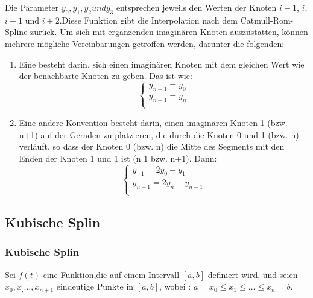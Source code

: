 {			
			
		
		Die Parameter \(y_0, y_1, y_2 und y_3\) entsprechen jeweils den Werten der Knoten \(i-1\), \(i\), \(i+1\) und \(i+2\).Diese Funktion gibt die Interpolation nach dem Catmull-Rom-Spline zurück.
		Um sich mit ergänzenden imaginären Knoten auszustatten, können mehrere mögliche Vereinbarungen getroffen werden, darunter die folgenden:
		\begin{enumerate}
			\item Eine besteht darin, sich einen imaginären Knoten mit dem gleichen Wert wie der benachbarte Knoten zu geben. Das ist wie:
			\begin{equation*}
				\begin{cases}
					y_{n-1} =y_0 \\
					y_{n+1} =y_n \\
				\end{cases}
			\end{equation*}
			\item Eine andere Konvention besteht darin, einen imaginären Knoten 1 (bzw. n+1) auf der Geraden zu platzieren, die durch die Knoten 0 und 1 (bzw. n) verläuft, so dass der Knoten 0 (bzw. n) die Mitte des Segments mit den Enden der Knoten 1 und 1 ist (n 1 bzw. n+1). Dann:
			\begin{equation*}
				\begin{cases}
					y_{-1}=2y_0−y_1 \\
					y_{n+1} =2y_n-y_{n-1} \\
				\end{cases}
			\end{equation*}
		\end{enumerate}
		
		
		\subsection{Kubische Splin}
		\begin{frame}
			\frametitle{Kubische Splin}
			
			\begin{definition}\label{def:def2}
				Sei \(f(t)\) eine Funktion,die auf einem Intervall \([a , b]\) definiert wird, und seien \(x_0,x_,\dots,x_{n + 1}\) eindeutige Punkte in \([a,b]\), wobei :  \(a = x_0 \leq x_1 \leq \dots \leq x_n = b\). \\
			\end{definition}
		\end{frame}
		
}
